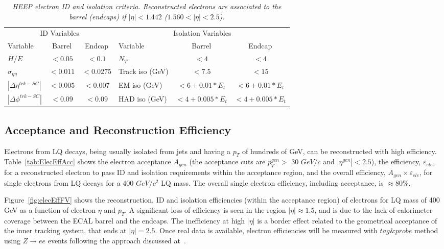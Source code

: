 \begin{table}[htbp]
  \label{tab:HEEPselection}
  \begin{center}
    \begin{tabular}{|lcc|lcc|} \hline
      \multicolumn{3}{|c|}{ID Variables} & \multicolumn{3}{|c|}{Isolation Variables} \\ 
      Variable & Barrel & Endcap & Variable & Barrel & Endcap  \\ \hline
      $H/E$  & $<0.05$ & $<0.1$ & $N_T$  & $<4$ & $<4$ \\ \hline
      $\sigma_{\eta\eta}$  & $<0.011$ & $<0.0275$ & Track iso (GeV) & $<7.5$ & $<15$ \\ \hline
      $|\Delta\eta^{trk-SC}|$ & $<0.005$ & $<0.007$ & EM iso (GeV) & $<6+0.01*E_{t}$ & $<6+0.01*E_{t}$ \\ \hline
      $|\Delta\phi^{trk-SC}|$ & $<0.09$ & $<0.09$ & HAD iso (GeV) & $<4+0.005*E_{t}$ & $<4+0.005*E_{t}$ \\ \hline
    \end{tabular}
  \caption{\small \sl HEEP electron ID and isolation criteria. 
    Reconstructed electrons are associated to the 
    barrel (endcaps) if $|\eta|<1.442$ ($1.560<|\eta|<2.5$).}
  \end{center}
\end{table}


\subsection{Acceptance and Reconstruction Efficiency} \label{sec:electronEfficiency}

Electrons from LQ decays, being usually isolated from jets and having a $p_{T}$ of 
hundreds of GeV, can be reconstructed with high efficiency. 
Table~\ref{tab:ElecEffAcc}
shows the electron acceptance $A_{gen}$
(the acceptance cuts are $p_{T}^{gen}>$ 30 $GeV/c$ and $|\eta^{gen}|<2.5$),
the efficiency, $\varepsilon_{ele}$, for a reconstructed electron to pass 
ID and isolation requirements within the acceptance region, 
and the overall efficiency, $A_{gen} \times \varepsilon_{ele}$,
for single electrons from LQ decays for a 400 $GeV/c^2$ LQ mass.
The overall single electron efficiency, including acceptance, is $\approx 80\%$.

Figure~\ref{fig:elecEffFV} shows the reconstruction, ID and isolation efficiencies
(within the acceptance region) of electrons for LQ mass of 400 GeV as a function of electron $\eta$ and $p_{T}$. 
A significant loss of efficiency is seen in the region $|\eta| \approx 1.5$, 
and is due to the lack of calorimeter coverage between the ECAL barrel and the endcaps. 
The inefficiency at high $|\eta|$ is a border effect related to the 
geometrical acceptance of the inner tracking system, that ends at $|\eta| = 2.5$.
Once real data is available, electron efficiencies will be measured 
with $tag\&probe$ method using $Z \rightarrow ee$ events 
following the approach discussed at~\cite{TagAndProbe}. \\

